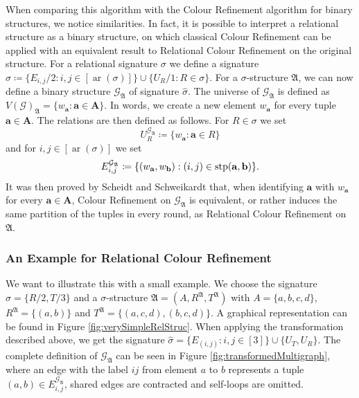When comparing this algorithm with the Colour Refinement algorithm for binary structures, we notice similarities.
In fact, it is possible to interpret a relational structure as a binary structure, on which classical Colour Refinement can be applied with an equivalent result to Relational Colour Refinement on the original structure.
For a relational signature $\sigma$ we define a signature $\widehat{\sigma}\coloneqq \{E_{i,j}/2 : i,j \in [\operatorname{ar}(\sigma)]\} \cup \{U_R/1 : R\in \sigma\}$.
For a $\sigma$-structure $\mathfrak A$, we can now define a binary structure $\mathcal{G}_{\mathfrak A}$ of signature $\widehat{\sigma}$.
The universe of $\mathcal{G}_{\mathfrak A}$ is defined as $V(\mathcal{G})_{\mathfrak A}=\{w_{\mathbf a} : \mathbf a \in \mathbf A\}$.
In words, we create a new element $w_{\mathbf a}$ for every tuple $\mathbf a \in \mathbf A$.
The relations are then defined as follows.
For $R\in \sigma$ we set 
$$U_R^{\mathcal{G}_{\mathfrak A}}\coloneqq \{w_{\mathbf a} : \mathbf a \in R\}$$ 
and for $i,j \in [\operatorname{ar}(\sigma)]$ we set 
$$E_{i,j}^{\mathcal{G}_{\mathfrak A}}\coloneqq \{(w_{\mathbf a}, w_{\mathbf b}) : (i, j) \in \operatorname{stp}(\mathbf a, \mathbf b)\}.$$
It was then proved by Scheidt and Schweikardt \cite{scheidt2025ColorRefinement} that, when identifying $\mathbf a$ with $w_{\mathbf a}$ for every $\mathbf a\in \mathbf A$, Colour Refinement on $\mathcal{G}_{\mathfrak A}$ is equivalent, or rather induces the same partition of the tuples in every round, as Relational Colour Refinement on $\mathfrak A$.

\subsubsection{An Example for Relational Colour Refinement}

We want to illustrate this with a small example.
We choose the signature $\sigma=\{R/2, T/3\}$ and a $\sigma$-structure $\mathfrak A=(A,R^{\mathfrak A},T^{\mathfrak A})$ with $A=\{a,b,c,d\}$, $R^{\mathfrak A}=\{(a,b)\}$ and $T^{\mathfrak A}=\{(a,c,d),(b,c,d)\}$.
A graphical representation can be found in Figure \ref{fig:verySimpleRelStruc}.
When applying the transformation described above, we get the signature $\widehat{\sigma}=\{E_{(i,j)} : i,j \in [3]\}\cup\{U_T, U_R\}$.
The complete definition of $\mathcal{G}_{\mathfrak A}$ can be seen in Figure \ref{fig:transformedMultigraph}, where an edge with the label $ij$ from element $a$ to $b$ represents a tuple $(a,b)\in E_{i,j}^{\mathcal{G}_{\mathfrak A}}$, shared edges are contracted and self-loops are omitted.

